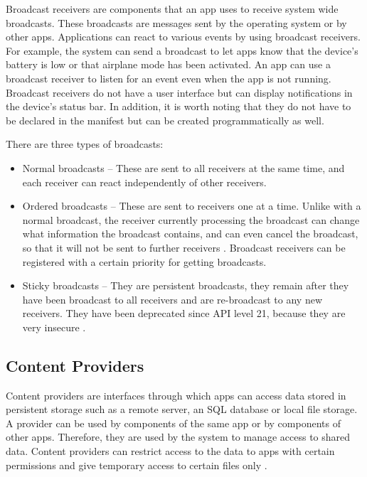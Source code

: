     Broadcast receivers are components that an app uses to receive system wide broadcasts. These broadcasts are messages sent by the operating system or by other apps. Applications can react to various events by using broadcast receivers. For example, the system can send a broadcast to let apps know that the device’s battery is low or that airplane mode has been activated. An app can use a broadcast receiver to listen for an event even when the app is not running. Broadcast receivers do not have a user interface but can display notifications in the device’s status bar. In addition, it is worth noting that they do not have to be declared in the manifest but can be created programmatically as well.
    
    There are three types of broadcasts:
    \begin{itemize}
        \item Normal broadcasts – These are sent to all receivers at the same time, and each receiver can react independently of other receivers.
        \item Ordered broadcasts – These are sent to receivers one at a time. Unlike with a normal broadcast, the receiver currently processing the broadcast can change what information the broadcast contains, and can even cancel the broadcast, so that it will not be sent to further receivers \cite{broadcasts_overview}. Broadcast receivers can be registered with a certain priority for getting broadcasts.
        \item Sticky broadcasts – They are persistent broadcasts, they remain after they have been broadcast to all receivers and are re-broadcast to any new receivers. They have been deprecated since API level 21, because they are very insecure \cite{sticky_broadcast}.
    \end{itemize}
    
    \subsection{Content Providers}
        \label{subsec:content_providers}
        
    Content providers are interfaces through which apps can access data stored in persistent storage such as a remote server, an SQL database or local file storage. A provider can be used by components of the same app or by components of other apps. Therefore, they are used by the system to manage access to shared data. Content providers can restrict access to the data to apps with certain permissions and give temporary access to certain files only \cite{android_app_fundamentals}.
